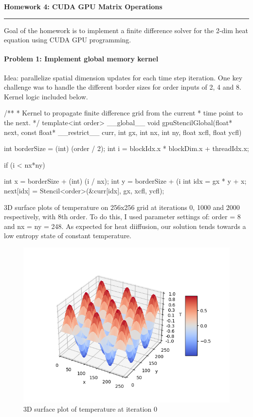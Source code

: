 \documentclass[12pt,letterpaper,twoside]{article}
\begin{document}
{\centering \textbf{Homework 4: CUDA GPU Matrix Operations\\}}
\vspace*{-8pt}\noindent\rule{\linewidth}{1pt}

Goal of the homework is to implement a finite difference solver for the
2-dim heat equation using CUDA GPU programming.

\paragraph{Problem 1: Implement global memory kernel } Idea: parallelize spatial
dimension updates for each time step iteration. One key challenge was to handle
the different border sizes for order inputs of 2, 4 and 8. Kernel logic included
below.

\begin{cpp}
/**
 * Kernel to propagate finite difference grid from the current
 * time point to the next.
 */
template<int order>
__global__
void gpuStencilGlobal(float* next, const float* __restrict__ curr, 
                      int gx, int nx, int ny, float xcfl, float ycfl) {
    
    int borderSize = (int) (order / 2);
    int i = blockIdx.x * blockDim.x + threadIdx.x;
   
    if (i < nx*ny) {
	int x = borderSize + (int) (i / nx);
	int y = borderSize + (i %
        int idx = gx * y + x;   
        next[idx] = Stencil<order>(&curr[idx], gx, xcfl, ycfl);
    
    }
}
\end{cpp}

3D surface plots of temperature on 256x256 grid at iterations 0, 1000 and 
2000 respectively, with 8th order. To do this, I used parameter settings of:
order = 8 and nx = ny = 248. As expected for heat diiffusion, our solution
tends towards a low entropy state of constant temperature.

\begin{figure}[!htbp]
    \centering
    \includegraphics[scale=0.7]{global_0000.png}
    \caption{3D surface plot of temperature at iteration 0}
\end{figure}
\end{document}

